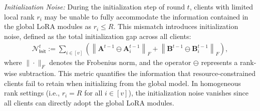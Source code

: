 \documentclass{article} %
\newcommand{\Init}{\mathsf{Init}}
\begin{document}
\textit{Initialization Noise:} During the initialization step of round $t$, clients with limited local rank $r_i$ may be unable to fully accommodate the information contained in the global LoRA modules as $r_i\leq R$. This mismatch introduces initialization noise, defined as the total initialization gap across all clients:
% 
\begin{align}
    \mathcal{N}_{\Init}^{t} 
    := 
    \sum_{i\in[v]} \left(\left\|{\mathbf{A}}^{t-1}\ominus {\mathbf{A}}_i^{t-1}\right\|_F + \left\|{\mathbf{B}^{t-1}}\ominus {\mathbf{B}}_i^{t-1}\right\|_F\right), \label{eq:initialization_noise_truncation_sum_direct}
\end{align}
where $\| \cdot \|_F$ denotes the Frobenius norm, and the operator $\ominus$ represents a rank-wise subtraction. This metric quantifies the information that resource-constrained clients fail to retain when initializing from the global model. In homogeneous rank settings (i.e., $r_i=R$ for all $i\in[v]$), the initialization noise vanishes since all clients can directly adopt the global LoRA modules. %
\end{document}
